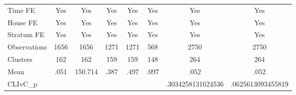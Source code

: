 {\begin{tabular}{l*{7}{c}}
Time FE         &      Yes         &      Yes         &      Yes         &      Yes         &      Yes         &      Yes         &      Yes         \\
House FE        &      Yes         &      Yes         &      Yes         &      Yes         &      Yes         &      Yes         &      Yes         \\
Stratum FE      &      Yes         &      Yes         &      Yes         &      Yes         &      Yes         &      Yes         &      Yes         \\
\midrule
Observations    &     1656         &     1656         &     1271         &     1271         &      568         &     2750         &     2750         \\
Clusters        &      162         &      162         &      159         &      159         &      148         &      264         &      264         \\
Mean            &     .051         &  150.714         &     .387         &     .497         &     .097         &     .052         &     .052         \\
CLIvC\_p         &                  &                  &                  &                  &                  &.3034258131624536         &.0625613093455819         \\
\bottomrule
\end{tabular}
}
